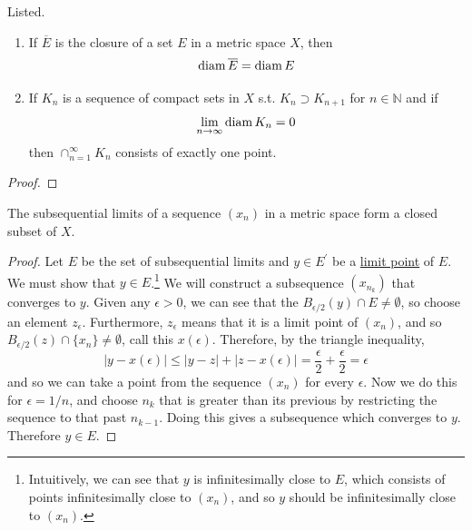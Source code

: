   \begin{theorem}
    \label{thm:nested-compact-sets}
    Listed. 
    \begin{enumerate}
      \item If $\overline{E}$ is the closure of a set $E$ in a metric space $X$, then 
      \begin{equation}
        \operatorname{diam}{\overline{E}} = \operatorname{diam}{E}
      \end{equation}

      \item If $K_n$ is a sequence of compact sets in $X$ s.t. $K_n \supset K_{n+1}$ for $n \in \mathbb{N}$ and if 
      \begin{equation}
        \lim_{n \rightarrow \infty} \operatorname{diam}{K_n} = 0
      \end{equation}
      then $\cap_{n=1}^\infty K_n$ consists of exactly one point. 
    \end{enumerate}
  \end{theorem}
  \begin{proof}
    
  \end{proof}
  
  \begin{theorem}
    \label{thm:subsequential-limits-form-closed-subset}
    The subsequential limits of a sequence $(x_n)$ in a metric space form a closed subset of $X$. 
  \end{theorem}
  \begin{proof}
    Let $E$ be the set of subsequential limits and $y \in E^\prime$ be a \hyperref[def:limit-point]{limit point} of $E$. We must show that $y \in E$.\footnote{Intuitively, we can see that $y$ is infinitesimally close to $E$, which consists of points infinitesimally close to $(x_n)$, and so $y$ should be infinitesimally close to $(x_n)$.} We will construct a subsequence $(x_{n_k})$ that converges to $y$. Given any $\epsilon > 0$, we can see that the $B_{\epsilon/2} (y) \cap E \neq \emptyset$, so choose an element $z_\epsilon$. Furthermore, $z_\epsilon$ means that it is a limit point of $(x_n)$, and so $B_{\epsilon/2} (z) \cap \{x_n\} \neq \emptyset$, call this $x(\epsilon)$. Therefore, by the triangle inequality, 
    \begin{equation}
      |y - x(\epsilon)| \leq |y - z| + |z - x(\epsilon)| = \frac{\epsilon}{2} + \frac{\epsilon}{2} = \epsilon
    \end{equation}
    and so we can take a point from the sequence $(x_n)$ for every $\epsilon$. Now we do this for $\epsilon = 1/n$, and choose $n_k$ that is greater than its previous by restricting the sequence to that past $n_{k-1}$. Doing this gives a subsequence which converges to $y$. Therefore $y \in E$. 
  \end{proof}


